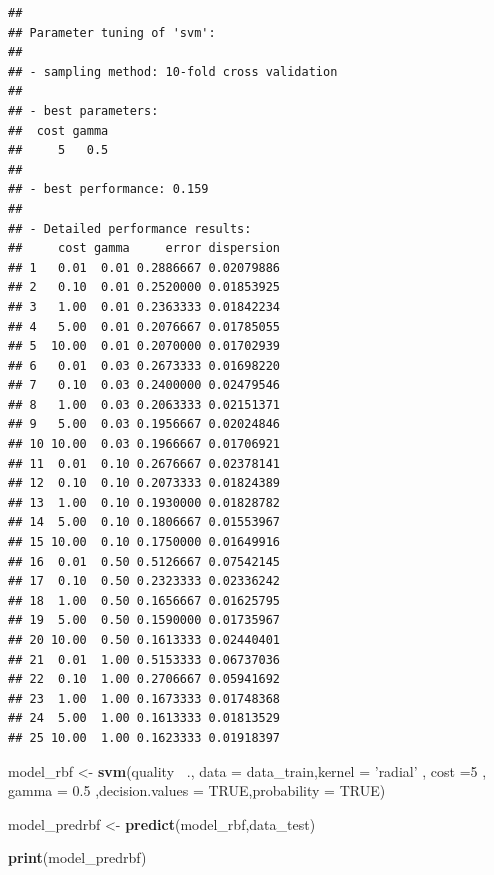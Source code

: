 \documentclass[]{article}
\newenvironment{Shaded}{\begin{snugshade}}{\end{snugshade}}
\newcommand{\DataTypeTok}[1]{\textcolor[rgb]{0.13,0.29,0.53}{#1}}
\newcommand{\DecValTok}[1]{\textcolor[rgb]{0.00,0.00,0.81}{#1}}
\newcommand{\FloatTok}[1]{\textcolor[rgb]{0.00,0.00,0.81}{#1}}
\newcommand{\KeywordTok}[1]{\textcolor[rgb]{0.13,0.29,0.53}{\textbf{#1}}}
\newcommand{\NormalTok}[1]{#1}
\newcommand{\OperatorTok}[1]{\textcolor[rgb]{0.81,0.36,0.00}{\textbf{#1}}}
\newcommand{\OtherTok}[1]{\textcolor[rgb]{0.56,0.35,0.01}{#1}}
\newcommand{\StringTok}[1]{\textcolor[rgb]{0.31,0.60,0.02}{#1}}
\begin{document}
\begin{verbatim}
## 
## Parameter tuning of 'svm':
## 
## - sampling method: 10-fold cross validation 
## 
## - best parameters:
##  cost gamma
##     5   0.5
## 
## - best performance: 0.159 
## 
## - Detailed performance results:
##     cost gamma     error dispersion
## 1   0.01  0.01 0.2886667 0.02079886
## 2   0.10  0.01 0.2520000 0.01853925
## 3   1.00  0.01 0.2363333 0.01842234
## 4   5.00  0.01 0.2076667 0.01785055
## 5  10.00  0.01 0.2070000 0.01702939
## 6   0.01  0.03 0.2673333 0.01698220
## 7   0.10  0.03 0.2400000 0.02479546
## 8   1.00  0.03 0.2063333 0.02151371
## 9   5.00  0.03 0.1956667 0.02024846
## 10 10.00  0.03 0.1966667 0.01706921
## 11  0.01  0.10 0.2676667 0.02378141
## 12  0.10  0.10 0.2073333 0.01824389
## 13  1.00  0.10 0.1930000 0.01828782
## 14  5.00  0.10 0.1806667 0.01553967
## 15 10.00  0.10 0.1750000 0.01649916
## 16  0.01  0.50 0.5126667 0.07542145
## 17  0.10  0.50 0.2323333 0.02336242
## 18  1.00  0.50 0.1656667 0.01625795
## 19  5.00  0.50 0.1590000 0.01735967
## 20 10.00  0.50 0.1613333 0.02440401
## 21  0.01  1.00 0.5153333 0.06737036
## 22  0.10  1.00 0.2706667 0.05941692
## 23  1.00  1.00 0.1673333 0.01748368
## 24  5.00  1.00 0.1613333 0.01813529
## 25 10.00  1.00 0.1623333 0.01918397
\end{verbatim}

\begin{Shaded}
\begin{Highlighting}[]
\NormalTok{model_rbf <-}\StringTok{ }\KeywordTok{svm}\NormalTok{(quality }\OperatorTok{~}\NormalTok{., }\DataTypeTok{data =}\NormalTok{ data_train,}\DataTypeTok{kernel =} \StringTok{'radial'} 
\NormalTok{             , }\DataTypeTok{cost =}\DecValTok{5}\NormalTok{ , }\DataTypeTok{gamma =} \FloatTok{0.5}\NormalTok{ ,}\DataTypeTok{decision.values =} \OtherTok{TRUE}\NormalTok{,}\DataTypeTok{probability =} \OtherTok{TRUE}\NormalTok{)}

\NormalTok{model_predrbf <-}\StringTok{ }\KeywordTok{predict}\NormalTok{(model_rbf,data_test)}

\KeywordTok{print}\NormalTok{(model_predrbf)}
\end{Highlighting}
\end{Shaded}
\end{document}

